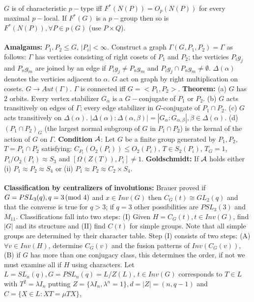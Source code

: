 $G$ is of characteristic $p-$type iff $F^*(N(P))= O_p(N(P))$ for every maximal $p-$local.
If $F^*(G)$ is a $p-$group then so is $F^*(N(P)), \forall P \in p(G)$ (use $P \times Q$).
\\
\\
{\bf Amalgams:} $P_1, P_2 \le G$, $|P_i|< \infty$.  Construct a graph $\Gamma(G, P_1, P_2)=\Gamma$
as follows: 
$\Gamma$ has verticies consisting of right cosets of $P_1$ and $P_2$; the verticies
$P_i g_j$ and $P_n g_m$ are
joined by an edge if 
$P_i g_j \ne P_n g_m$ and
$P_i g_j \cap P_n g_m \ne \emptyset$.  $\Delta(\alpha)$ denotes the verticies
adjacent to $\alpha$.  $G$ act on graph by right multiplication on cosets.  
$G \rightarrow Aut(\Gamma)$.  $\Gamma$ is connected iff $G= <P_1 , P_2>$.  {\bf Theorem:}
(a) $G$ has $2$ orbits.  Every vertex stabilizer  $G_{\alpha}$ is a $G-$conjugate of
$P_1$ or $P_2$. (b) $G$ acts transitively on edges of $\Gamma$; every edge stabilizer
in $G$-conjugate of $P_1 \cap P_2$.  (c) $G$ acts transitively on $\Delta(\alpha)$.
$|\Delta(\alpha):\Delta(\alpha, \beta)|= |G_{\alpha}: G_{\alpha, \beta}|, \beta \in \Delta(\alpha)$.
(d) $(P_1  \cap P_2)_G$ (the largest normal subgroup of $G$ in $P_1 \cap P_2$)
is the kernal of the action of $G$ on $\Gamma$. {\bf Condition} ${\cal A}$:  Let $G$ be a
finite group generated by 
$P_1, P_2$,
$T= P_1 \cap P_2$ satisfying: $C_{P_i}(O_2(P_i)) \le O_2(P_i)$, $T \in S_2(P_i)$,
$T_G=1$, $P_i/O_2(P_i) \approx S_3$ and $[\Omega(Z(T)), P_i] \ne 1$.  {\bf Goldschmidt:}
If ${\cal A}$ holds either (i) $P_1 \approx P_2 \approx S_4$ or 
(ii) $P_1 \approx P_2 \approx C_2 \times S_4$.
\\
\\
{\bf Classification by 
centralizers of involutions:}
Brauer proved if $G=PSL_3(q), q = 3 \thinspace \textnormal{(mod } 4 \textnormal{)}$ and 
$x \in Inv(G)$ then $C_G(t) \cong GL_2(q)$
and that the converse is true for $q>3$; if $q=3$ other possibilities are $PSL_3(3)$ and
$M_{11}$.  Classifications fall into two steps: (I) Given $H= C_G(t), t \in Inv(G)$, find
$|G|$ and its structure and (II) find $C(t)$ for simple groups.   Note that all
simple groups are determined by their character table. Step (I)
consists of two steps:
(A) $\forall v \in Inv(H)$, determine $C_G(v)$ and the fusion patterns of $Inv(C_G(v))$,
(B) if $G$ has more than one conjugacy class, this determines the order, if not we must
examine all if $H$ using characters.  
Let $L= SL_n(q), G=PSL_n(q) = L/Z(L)$, 
$t \in Inv(G)$ corresponds to $T \in L$ with $T^2= \lambda I_n$ putting 
$Z= \{ \lambda I_n, \lambda^n=1 \}, d= |Z|= (n,q-1)$ and $C= \{X \in L: XT= \mu TX \}$,
